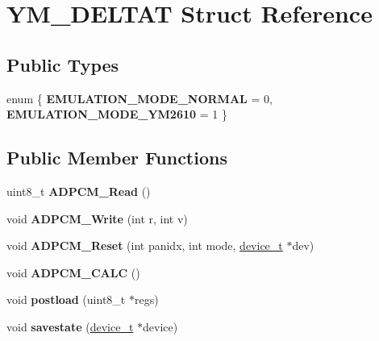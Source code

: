 \hypertarget{structYM__DELTAT}{\section{Y\-M\-\_\-\-D\-E\-L\-T\-A\-T Struct Reference}
\label{structYM__DELTAT}
}
\subsection*{Public Types}
\begin{DoxyCompactItemize}
\item 
enum \{ {\bfseries E\-M\-U\-L\-A\-T\-I\-O\-N\-\_\-\-M\-O\-D\-E\-\_\-\-N\-O\-R\-M\-A\-L} =  0, 
{\bfseries E\-M\-U\-L\-A\-T\-I\-O\-N\-\_\-\-M\-O\-D\-E\-\_\-\-Y\-M2610} =  1
 \}
\end{DoxyCompactItemize}
\subsection*{Public Member Functions}
\begin{DoxyCompactItemize}
\item 
\hypertarget{structYM__DELTAT_a1f1df3a36258b6539a0c226f93042b8c}{uint8\-\_\-t {\bfseries A\-D\-P\-C\-M\-\_\-\-Read} ()}\label{structYM__DELTAT_a1f1df3a36258b6539a0c226f93042b8c}

\item 
\hypertarget{structYM__DELTAT_abc478f2b19b3be1d5b6630c069039b07}{void {\bfseries A\-D\-P\-C\-M\-\_\-\-Write} (int r, int v)}\label{structYM__DELTAT_abc478f2b19b3be1d5b6630c069039b07}

\item 
\hypertarget{structYM__DELTAT_a2ef69bc743f2b813d6772cb429318c49}{void {\bfseries A\-D\-P\-C\-M\-\_\-\-Reset} (int panidx, int mode, \hyperlink{classdevice__t}{device\-\_\-t} $\ast$dev)}\label{structYM__DELTAT_a2ef69bc743f2b813d6772cb429318c49}

\item 
\hypertarget{structYM__DELTAT_ae2d5340ecafcac5918b419ba171760b5}{void {\bfseries A\-D\-P\-C\-M\-\_\-\-C\-A\-L\-C} ()}\label{structYM__DELTAT_ae2d5340ecafcac5918b419ba171760b5}

\item 
\hypertarget{structYM__DELTAT_a9aa21b79dcadea64c1db145eb84c392f}{void {\bfseries postload} (uint8\-\_\-t $\ast$regs)}\label{structYM__DELTAT_a9aa21b79dcadea64c1db145eb84c392f}

\item 
\hypertarget{structYM__DELTAT_a19318f67a54dc1e3f7fc81d8f108f8be}{void {\bfseries savestate} (\hyperlink{classdevice__t}{device\-\_\-t} $\ast$device)}\label{structYM__DELTAT_a19318f67a54dc1e3f7fc81d8f108f8be}

\end{DoxyCompactItemize}
